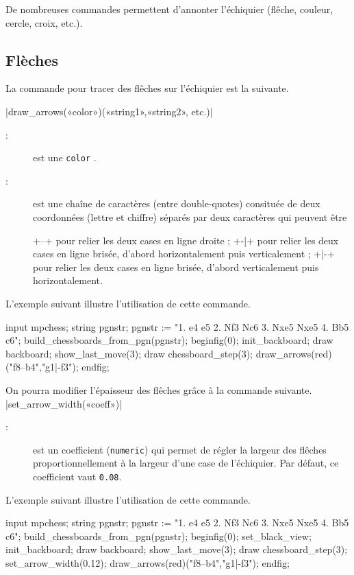 \documentclass[french]{ltxdoc}
\begin{document}
De nombreuses commandes permettent d’annonter l’échiquier (flêche, couleur, cercle, croix, etc.).

\subsection{Flèches}

La commande pour tracer des flêches sur l’échiquier est la suivante.

\commande|draw_arrows(«color»)(«string1»,«string2», etc.)|\smallskip
\begin{description}
\item[:] est une \lstinline+color+ \MP.
\item[:] est une chaîne de caractères (entre double-quotes) consituée de deux coordonnées (lettre et chiffre) séparés par deux caractères qui peuvent être
\begin{description}
\vitem+--+ pour relier les deux cases en ligne droite ;
\vitem+-|+ pour relier les deux cases en ligne brisée, d’abord horizontalement puis verticalement ;
\vitem+|-+ pour relier les deux cases en ligne brisée, d’abord verticalement puis horizontalement.
\end{description}
\end{description}

L’exemple suivant illustre l’utilisation de cette commande.
\begin{ExempleMP}
input mpchess;
string pgnstr;
pgnstr := "1. e4 e5 2. Nf3 Nc6 3. Nxe5 Nxe5 4. Bb5 c6";
build_chessboards_from_pgn(pgnstr);
beginfig(0);
init_backboard;
draw backboard;
show_last_move(3);
draw chessboard_step(3); %
draw_arrows(red)("f8--b4","g1|-f3");
endfig;
\end{ExempleMP}

On pourra modifier l’épaisseur des flêches grâce à la commande suivante.
\commande|set_arrow_width(«coeff»)|\smallskip

\begin{description}
  \item[:] est un coefficient (\lstinline+numeric+) qui permet de
  régler la largeur des flêches proportionnellement à la largeur d’une case de
  l’échiquier. Par défaut, ce coefficient vaut \lstinline+0.08+.
\end{description}

L’exemple suivant illustre l’utilisation de cette commande.
\begin{ExempleMP}
input mpchess;
string pgnstr;
pgnstr := "1. e4 e5 2. Nf3 Nc6 3. Nxe5 Nxe5 4. Bb5 c6";
build_chessboards_from_pgn(pgnstr);
beginfig(0);
set_black_view;
init_backboard;
draw backboard;
show_last_move(3);
draw chessboard_step(3); %
set_arrow_width(0.12);
draw_arrows(red)("f8--b4","g1|-f3");
endfig;
\end{ExempleMP}
\end{document}

